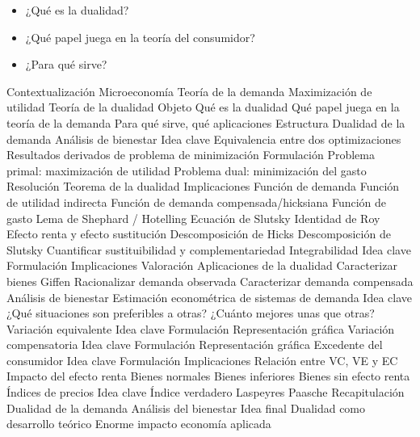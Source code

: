 \documentclass{nuevotema}
\begin{document}

\begin{itemize}
	\item ¿Qué es la dualidad?
	\item ¿Qué papel juega en la teoría del consumidor?
	\item ¿Para qué sirve?
\end{itemize}

\esquemacorto

\begin{esquema}[enumerate]
	\1[] 
		\2 Contextualización
			\3 Microeconomía
			\3 Teoría de la demanda
			\3 Maximización de utilidad
			\3 Teoría de la dualidad
		\2 Objeto
			\3 Qué es la dualidad
			\3 Qué papel juega en la teoría de la demanda
			\3 Para qué sirve, qué aplicaciones
		\2 Estructura
			\3 Dualidad de la demanda
			\3 Análisis de bienestar
	\1 
		\2 Idea clave
			\3 Equivalencia entre dos optimizaciones
			\3 Resultados derivados de problema de minimización
		\2 Formulación
			\3[(i)] Problema primal: maximización de utilidad
			\3[(ii)] Problema dual: minimización del gasto
			\3 Resolución
			\3 Teorema de la dualidad
		\2 Implicaciones
			\3 Función de demanda
			\3 Función de utilidad indirecta
			\3 Función de demanda compensada/hicksiana
			\3 Función de gasto
			\3 Lema de Shephard / Hotelling
			\3 Ecuación de Slutsky
			\3 Identidad de Roy
			\3 Efecto renta y efecto sustitución
			\3 Descomposición de Hicks
			\3 Descomposición de Slutsky
			\3 Cuantificar sustituibilidad y complementariedad
		\2 Integrabilidad
			\3 Idea clave
			\3 Formulación
			\3 Implicaciones
			\3 Valoración
		\2 Aplicaciones de la dualidad
			\3 Caracterizar bienes Giffen
			\3 Racionalizar demanda observada
			\3 Caracterizar demanda compensada
			\3 Análisis de bienestar
			\3 Estimación econométrica de sistemas de demanda
	\1 
		\2 Idea clave
			\3 ¿Qué situaciones son preferibles a otras?
			\3 ¿Cuánto mejores unas que otras?
		\2 Variación equivalente
			\3 Idea clave
			\3 Formulación
			\3 Representación gráfica
		\2 Variación compensatoria
			\3 Idea clave
			\3 Formulación
			\3 Representación gráfica
		\2 Excedente del consumidor
			\3 Idea clave
			\3 Formulación
			\3 Implicaciones
		\2 Relación entre VC, VE y EC
			\3 Impacto del efecto renta
			\3 Bienes normales
			\3 Bienes inferiores
			\3 Bienes sin efecto renta
		\2 Índices de precios
			\3 Idea clave
			\3 Índice verdadero
			\3 Laspeyres
			\3 Paasche
	\1[] 
		\2 Recapitulación
			\3 Dualidad de la demanda
			\3 Análisis del bienestar
		\2 Idea final
			\3 Dualidad como desarrollo teórico
			\3 Enorme impacto economía aplicada

\end{esquema}
\end{document}
